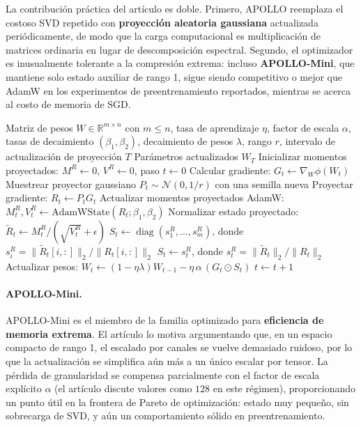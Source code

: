 La contribución práctica del artículo es doble. Primero, APOLLO reemplaza el costoso SVD repetido con \textbf{proyección aleatoria gaussiana} actualizada periódicamente, de modo que la carga computacional es multiplicación de matrices ordinaria en lugar de descomposición espectral. Segundo, el optimizador es inusualmente tolerante a la compresión extrema: incluso \textbf{APOLLO-Mini}, que mantiene solo estado auxiliar de rango 1, sigue siendo competitivo o mejor que AdamW en los experimentos de preentrenamiento reportados, mientras se acerca al costo de memoria de SGD.

\begin{algorithm}[H]
\caption{APOLLO / APOLLO-Mini Escalado de Gradiente Estructurado}
\label{alg:apollo-family}
\begin{algorithmic}[1]
\Require Matriz de pesos $W \in \mathbb{R}^{m \times n}$ con $m \le n$, tasa de aprendizaje $\eta$, factor de escala $\alpha$, tasas de decaimiento $(\beta_1, \beta_2)$, decaimiento de pesos $\lambda$, rango $r$, intervalo de actualización de proyección $T$
\Ensure Parámetros actualizados $W_T$
\State Inicializar momentos proyectados: $M^R \gets 0$, $V^R \gets 0$, paso $t \gets 0$
\Repeat
    \State Calcular gradiente: $G_t \gets \nabla_W \phi(W_t)$
        \State Muestrear proyector gaussiano $P_t \sim \mathcal{N}(0, 1/r)$ con una semilla nueva
    \EndIf
    \State Proyectar gradiente: $R_t \gets P_t G_t$ 
    \State Actualizar momentos proyectados AdamW: $M_t^R, V_t^R \gets \text{AdamWState}(R_t; \beta_1, \beta_2)$
    \State Normalizar estado proyectado: $\widetilde{R}_t \gets M_t^R / (\sqrt{V_t^R}+\epsilon)$
        \State $S_t \gets \operatorname{diag}(s_1^R, \ldots, s_m^R)$, donde $s_i^R = \|\widetilde{R}_t[i,:]\|_2 / \|R_t[i,:]\|_2$
    \Else
        \State $S_t \gets s_t^R$, donde $s_t^R = \|\widetilde{R}_t\|_2 / \|R_t\|_2$
    \EndIf
    \State Actualizar pesos: $W_t \gets (1-\eta\lambda)W_{t-1} - \eta\,\alpha\,(G_t \odot S_t)$
    \State $t \gets t+1$
\end{algorithmic}
\end{algorithm}

\paragraph{APOLLO-Mini.}
APOLLO-Mini es el miembro de la familia optimizado para \textbf{eficiencia de memoria extrema}. El artículo lo motiva argumentando que, en un espacio compacto de rango 1, el escalado por canales se vuelve demasiado ruidoso, por lo que la actualización se simplifica aún más a un único escalar por tensor. La pérdida de granularidad se compensa parcialmente con el factor de escala explícito $\alpha$ (el artículo discute valores como $128$ en este régimen), proporcionando un punto útil en la frontera de Pareto de optimización: estado muy pequeño, sin sobrecarga de SVD, y aún un comportamiento sólido en preentrenamiento.

